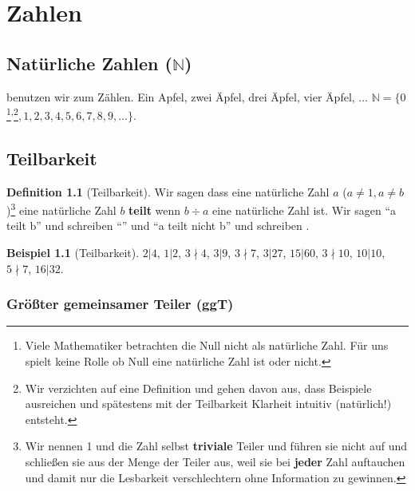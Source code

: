 \documentclass[a4paper]{book}%
\theoremstyle{definition}
\newtheorem{definition}{Definition}
\newtheorem{beispiel}{Beispiel}
\begin{document}
\chapter{Zahlen}

\section{Natürliche Zahlen ($\mathbb{N}$)}

\textbf{} benutzen wir zum Zählen. Ein Apfel, zwei Äpfel, drei Äpfel, vier Äpfel, ... $\mathbb{N} = \{ 0$\footnote{Viele Mathematiker betrachten die Null nicht als natürliche Zahl. Für uns spielt keine Rolle ob Null eine natürliche Zahl ist oder nicht.}\textsuperscript{,}\footnote{Wir verzichten auf eine Definition und gehen davon aus, dass Beispiele ausreichen und spätestens mit der Teilbarkeit Klarheit intuitiv (natürlich!) entsteht.}$, 1, 2, 3, 4, 5, 6, 7, 8, 9, ...\}$.


\section{Teilbarkeit}\label{def:teilbarkeit}

\begin{definition}[Teilbarkeit]
    Wir sagen dass eine natürliche Zahl $a$ ($a \neq 1, a \neq b$)\footnote{Wir nennen 1 und die Zahl selbst \textbf{triviale} Teiler und führen sie nicht auf und schließen sie aus der Menge der Teiler aus, weil sie bei \textbf{jeder} Zahl auftauchen und damit nur die Lesbarkeit verschlechtern ohne Information zu gewinnen.} eine natürliche Zahl $b$ \textbf{teilt} wenn $b \div a$ eine natürliche Zahl ist. Wir sagen \enquote{a teilt b} und schreiben \enquote{} und \enquote{a teilt nicht b} und schreiben .
\end{definition}

\begin{beispiel}[Teilbarkeit]
    $2 | 4$, $1 | 2$, $3 \nmid 4$, $3 | 9$, $3 \nmid 7$, $3 | 27$, $15 | 60$, $3 \nmid 10$, $10 | 10$, $ 5 \nmid 7$, $16 | 32$.
\end{beispiel}


\subsection{Größter gemeinsamer Teiler (ggT)}
\end{document}
